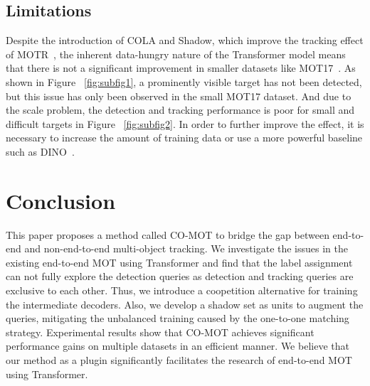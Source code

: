 \documentclass{article}
\begin{document}
\subsection{Limitations}
Despite the introduction of COLA and Shadow, which improve the tracking effect of MOTR~\cite{zeng2022motr}, the inherent data-hungry nature of the Transformer model means that there is not a significant improvement in smaller datasets like MOT17~\cite{milan2016mot16}. As shown in Figure ~\ref{fig:subfig1}, a prominently visible target has not been detected, but this issue has only been observed in the small MOT17 dataset. And due to the scale problem, the detection and tracking performance is poor for small and difficult targets in Figure ~\ref{fig:subfig2}. In order to further improve the effect, it is necessary to increase the amount of training data or use a more powerful baseline such as DINO~\cite{zhang2022dino}.

\section{Conclusion}
This paper proposes a method called CO-MOT to bridge the gap between end-to-end and non-end-to-end multi-object tracking.  We investigate the issues in the existing end-to-end MOT using Transformer and find that the label assignment can not fully explore the detection queries as detection and tracking queries are exclusive to each other. Thus, we introduce a coopetition alternative for training the intermediate decoders. Also, we develop a shadow set as units to augment the queries, mitigating the unbalanced training caused by the one-to-one matching strategy. Experimental results show that CO-MOT achieves significant performance gains on multiple datasets in an efficient manner. We believe that our method as a plugin significantly facilitates the research of end-to-end MOT using Transformer.












\end{document}
